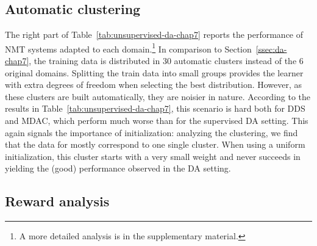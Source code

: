 \subsection{Automatic clustering}\label{ssec:clda-chap7}
The right part of Table~\ref{tab:unsupervised-da-chap7} reports the performance of NMT systems adapted to each domain.\footnote{A more detailed analysis is in the supplementary material.} In comparison to Section~\ref{ssec:da-chap7}, the training data is distributed in 30 automatic clusters instead of the 6 original domains. Splitting the train data into small groups provides the learner with extra degrees of freedom when selecting the best distribution. However, as these clusters are built automatically, they are noisier in nature. According to the results in Table~\ref{tab:unsupervised-da-chap7}, this scenario is hard both for DDS and MDAC, which perform much worse than for the supervised DA setting. This again signals the importance of initialization: analyzing the clustering, we find that the data for  mostly correspond to one single cluster. When using a uniform initialization, this cluster starts with a very small weight and never succeeds in yielding the (good) performance observed in the DA setting.

\subsection{Reward analysis}

